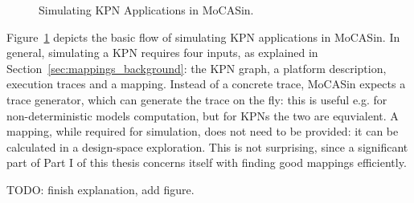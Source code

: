 \begin{figure}[h]
	\centering
   \resizebox{0.55\textwidth}{!}{}
	\caption{Simulating KPN Applications in MoCASin.}
	\label{fig:mocasin_kpn_simulation}
\end{figure}

Figure~\ref{fig:mocasin_kpn_simulation} depicts the basic flow of simulating KPN applications in MoCASin. In general, simulating a KPN requires four inputs, as explained in Section~\ref{sec:mappings_background}: the KPN graph, a platform description, execution traces and a mapping. Instead of a concrete trace, MoCASin expects a trace generator, which can generate the trace on the fly: this is useful e.g. for non-deterministic models computation, but for KPNs the two are equvialent. A mapping, while required for simulation, does not need to be provided: it can be calculated in a design-space exploration. This is not surprising, since a significant part of Part I of this thesis concerns itself with finding good mappings efficiently.

TODO: finish explanation, add figure.
